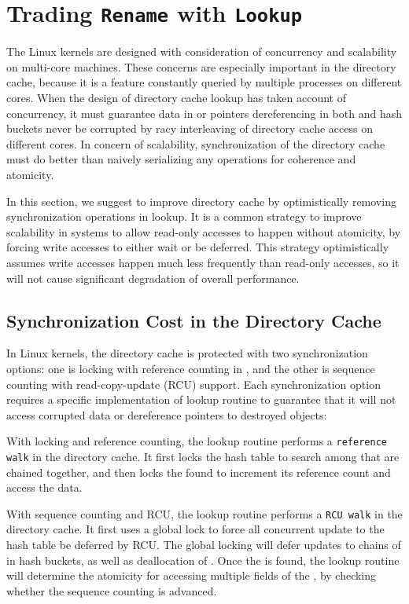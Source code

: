 \section{Trading {\tt Rename} with {\tt Lookup}}
\label{sec:update}

The Linux kernels are designed with consideration of concurrency and
scalability on multi-core machines.
These concerns are especially important in the directory cache,
because it is a feature constantly queried by multiple processes on different cores.
When the design of directory cache lookup has taken account of
concurrency,
it must guarantee data in \dentries{} or pointers dereferencing in both \dentries{} and hash buckets never be corrupted
by racy interleaving of directory cache access on different cores.
In concern of scalability,
synchronization of the directory cache must do better than naively serializing any operations for coherence and atomicity.

In this section, we suggest to improve directory cache by optimistically removing synchronization operations in lookup.
It is a common strategy to improve scalability in systems
to allow read-only accesses to happen without atomicity, by forcing write accesses to either wait or be deferred.
This strategy optimistically assumes write accesses happen much less frequently
than read-only accesses,
so it will not cause significant degradation of overall performance.

\subsection{Synchronization Cost in the Directory Cache}

In Linux kernels, the directory cache is protected with two synchronization options:
one is locking with reference counting in \dentries{},
and the other is sequence counting with read-copy-update (RCU) support.
Each synchronization option requires a specific implementation of lookup routine
to guarantee that it will not access corrupted data or dereference pointers to destroyed objects:

\begin{compactitem}

\item With locking and reference counting,
the lookup routine performs a {\tt reference walk} in the directory cache.
It first locks the hash table to search among \dentries{} that are chained together,
and then locks the found \dentry{} to increment its reference count
and access the data.

\item With sequence counting and RCU,
the lookup routine performs a {\tt RCU walk} in the directory cache.
It first uses a global lock to force all concurrent update to the hash table be
deferred by RCU.
The global locking will defer updates to chains of \dentries{} in hash buckets,
as well as deallocation of \dentries{}.
Once the \dentry{} is found, the lookup routine will determine the atomicity
for accessing multiple fields of the \dentry{},
by checking whether the sequence counting is advanced.

\end{compactitem}

